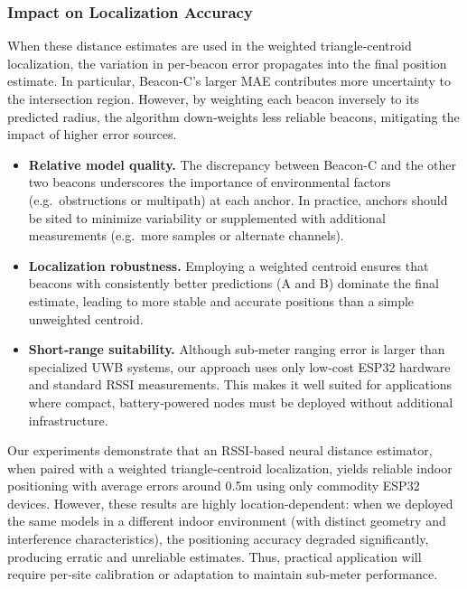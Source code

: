 \subsubsection{Impact on Localization Accuracy}

When these distance estimates are used in the weighted triangle‑centroid localization, the variation in per‑beacon error propagates into the final position estimate.  In particular, Beacon-C’s larger MAE contributes more uncertainty to the intersection region.  However, by weighting each beacon inversely to its predicted radius, the algorithm down‑weights less reliable beacons, mitigating the impact of higher error sources.

\begin{itemize}
\item \textbf{Relative model quality.}  The discrepancy between Beacon-C and the other two beacons underscores the importance of environmental factors (e.g.\ obstructions or multipath) at each anchor.  In practice, anchors should be sited to minimize variability or supplemented with additional measurements (e.g.\ more samples or alternate channels).
\item \textbf{Localization robustness.}  Employing a weighted centroid ensures that beacons with consistently better predictions (A and B) dominate the final estimate, leading to more stable and accurate positions than a simple unweighted centroid.
\item \textbf{Short‑range suitability.}  Although sub‑meter ranging error is larger than specialized UWB systems, our approach uses only low‑cost ESP32 hardware and standard RSSI measurements.  This makes it well suited for applications where compact, battery‑powered nodes must be deployed without additional infrastructure.

\end{itemize}

Our experiments demonstrate that an RSSI‑based neural distance estimator, when paired with a weighted triangle‑centroid localization, yields reliable indoor positioning with average errors around 0.5m using only commodity ESP32 devices. However, these results are highly location‑dependent: when we deployed the same models in a different indoor environment (with distinct geometry and interference characteristics), the positioning accuracy degraded significantly, producing erratic and unreliable estimates. Thus, practical application will require per‑site calibration or adaptation to maintain sub‑meter performance.
